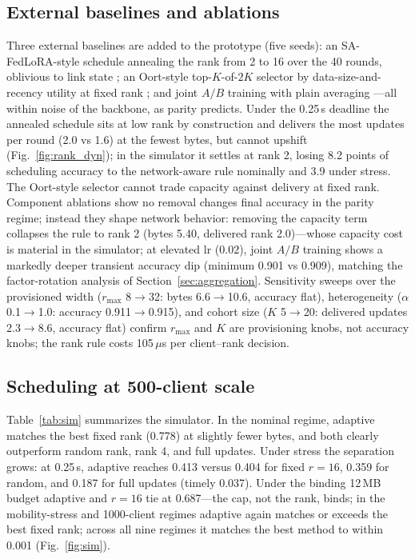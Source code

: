 \documentclass[conference]{IEEEtran}
\begin{document}
\subsection{External baselines and ablations}
Three external baselines are added to the prototype (five seeds): an SA-FedLoRA-style schedule annealing the rank from 2 to 16 over the 40 rounds, oblivious to link state \cite{yang2024safedlora}; an Oort-style top-$K$-of-$2K$ selector by data-size-and-recency utility at fixed rank \cite{oort2021oort}; and joint $A/B$ training with plain averaging \cite{guo2025fedsalora}---all within noise of the backbone, as parity predicts. Under the 0.25\,s deadline the annealed schedule sits at low rank by construction and delivers the most updates per round (2.0 vs 1.6) at the fewest bytes, but cannot upshift (Fig.~\ref{fig:rank_dyn}); in the simulator it settles at rank 2, losing 8.2 points of scheduling accuracy to the network-aware rule nominally and 3.9 under stress. The Oort-style selector cannot trade capacity against delivery at fixed rank. Component ablations show no removal changes final accuracy in the parity regime; instead they shape network behavior: removing the capacity term collapses the rule to rank 2 (bytes 5.40, delivered rank 2.0)---whose capacity cost is material in the simulator; at elevated lr ($0.02$), joint $A/B$ training shows a markedly deeper transient accuracy dip (minimum 0.901 vs 0.909), matching the factor-rotation analysis of Section~\ref{sec:aggregation}. Sensitivity sweeps over the provisioned width ($r_{\max}$ 8$\to$32: bytes 6.6$\to$10.6, accuracy flat), heterogeneity ($\alpha$ 0.1$\to$1.0: accuracy 0.911$\to$0.915), and cohort size ($K$ 5$\to$20: delivered updates 2.3$\to$8.6, accuracy flat) confirm $r_{\max}$ and $K$ are provisioning knobs, not accuracy knobs; the rank rule costs 105\,$\mu$s per client--rank decision.

\subsection{Scheduling at 500-client scale}
Table~\ref{tab:sim} summarizes the simulator. In the nominal regime, adaptive matches the best fixed rank (0.778) at slightly fewer bytes, and both clearly outperform random rank, rank 4, and full updates. Under stress the separation grows: at 0.25\,s, adaptive reaches 0.413 versus 0.404 for fixed $r{=}16$, 0.359 for random, and 0.187 for full updates (timely 0.037). Under the binding 12\,MB budget adaptive and $r{=}16$ tie at 0.687---the cap, not the rank, binds; in the mobility-stress and 1000-client regimes adaptive again matches or exceeds the best fixed rank; across all nine regimes it matches the best method to within 0.001 (Fig.~\ref{fig:sim}).
\end{document}
